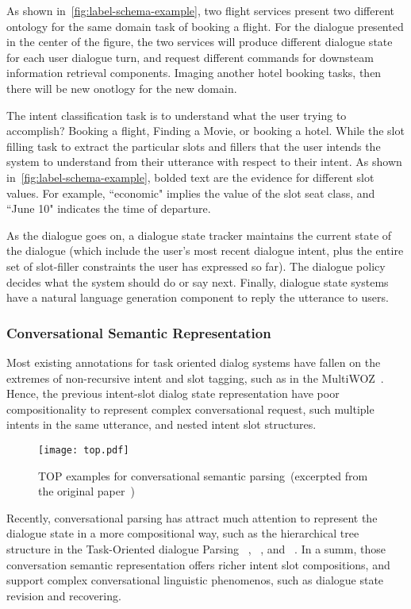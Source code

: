 As shown in~\autoref{fig:label-schema-example}, two flight services
present two different ontology for the same domain task of booking a
flight. For the dialogue presented in the center of the figure, the
two services will produce different dialogue state for each user
dialogue turn, and request different commands for downsteam
information retrieval components. Imaging another hotel booking tasks,
then there will be new onotlogy for the new domain.

The intent classification task is to understand what the user trying
to accomplish? Booking a flight, Finding a Movie, or booking a
hotel. While the slot filling task to extract the particular slots and
fillers that the user intends the system to understand from their
utterance with respect to their intent. As shown
in~\autoref{fig:label-schema-example}, bolded text are the evidence
for different slot values. For example, ``economic" implies the value
of the slot seat class, and ``June 10" indicates the time of
departure.

As the dialogue goes on, a dialogue state tracker maintains the
current state of the dialogue (which include the user's most recent
dialogue intent, plus the entire set of slot-filler constraints the
user has expressed so far). The dialogue policy decides what the
system should do or say next. Finally, dialogue state systems have a
natural language generation component to reply the utterance to users.

\subsubsection{Conversational Semantic Representation}
\label{ssec:bg:dialogue-rep}
Most existing annotations for task oriented dialog systems have fallen
on the extremes of non-recursive intent and slot tagging, such as in
the MultiWOZ~\cite{budzianowski2018multiwoz}. Hence, the previous
intent-slot dialog state representation have poor compositionality to
represent complex conversational request, such multiple intents in the
same utterance, and nested intent slot structures.
\begin{figure}[!th]
\centering
\texttt{[image: top.pdf]}
\caption{\label{fig:top-example} TOP examples for conversational
  semantic parsing~(excerpted from the original
  paper~\citep{gupta-etal-2018-semantic-parsing})}
\end{figure}

Recently, conversational parsing has attract much attention to
represent the dialogue state in a more compositional way, such as the
hierarchical tree structure in the Task-Oriented dialogue Parsing
~\cite[TOP,][]{gupta-etal-2018-semantic-parsing,aghajanyan2020conversational},
~\cite[TreeDST,][]{cheng2020conversational}, and
~\cite[Dataflow,][]{andreas2020task}. In a summ, those conversation
semantic representation offers richer intent slot compositions, and
support complex conversational linguistic phenomenos, such as dialogue
state revision and recovering.

